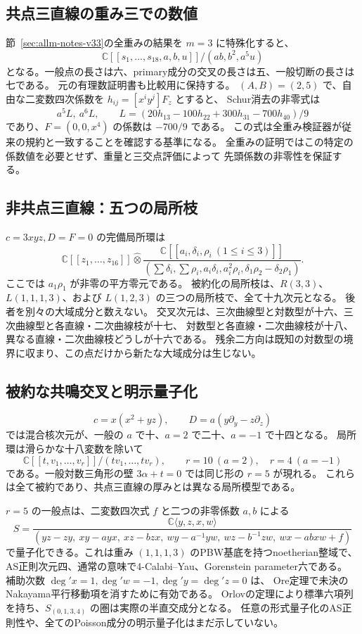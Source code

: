 \subsection{共点三直線の重み三での数値}
節~\ref{sec:allm-notes-v33}の全重みの結果を $m=3$ に特殊化すると、
\[
 \mathbb C[[s_1,\ldots,s_{18},a,b,u]]/(ab,b^2,a^5u)
\]
となる。一般点の長さは六、primary成分の交叉の長さは五、一般切断の長さは七である。
元の有理数証明書も比較用に保持する。
$(A,B)=(2,5)$ で、自由な二変数四次係数を $h_{ij}=[x^iy^j]F_z$ とすると、
Schur消去の非零式は
\[
 a^5L,\ a^6L,\qquad
 L=(20h_{13}-100h_{22}+300h_{31}-700h_{40})/9
\]
であり、$F=(0,0,x^4)$ の係数は $-700/9$ である。
この式は全重み検証器が従来の規約と一致することを確認する基準になる。
全重みの証明ではこの特定の係数値を必要とせず、重量と三交点評価によって
先頭係数の非零性を保証する。

\subsection{非共点三直線：五つの局所枝}
$c=3xyz,D=F=0$ の完備局所環は
\[
 \mathbb C[[z_1,\ldots,z_{16}]]\widehat\otimes
 \frac{\mathbb C[[a_i,\delta_i,\rho_i\ (1\le i\le3)]]}
 {(\sum\delta_i,\sum\rho_i,a_i\delta_i,a_i^2\rho_i,
     \delta_1\rho_2-\delta_2\rho_1)}.
\]
ここでは $a_1\rho_1$ が非零の平方零元である。
被約化の局所枝は、$R(3,3)$、$L(1,1,1,3)$、および
$L(1,2,3)$ の三つの局所枝で、全て十九次元となる。
後者を別々の大域成分と数えない。
交叉次元は、三次曲線型と対数型が十六、三次曲線型と各直線・二次曲線枝が十七、
対数型と各直線・二次曲線枝が十八、異なる直線・二次曲線枝どうしが十六である。
残余二方向は既知の対数型の境界に収まり、この点だけから新たな大域成分は生じない。

\subsection{被約な共鳴交叉と明示量子化}
\[
 c=x(x^2+yz),\qquad D=a(y\partial_y-z\partial_z)
\]
では混合核次元が、一般の $a$ で十、$a=2$ で二十、$a=-1$ で十四となる。
局所環は滑らかな十八変数を除いて
\[
 \mathbb C[[t,v_1,\ldots,v_r]]/(tv_1,\ldots,tv_r),
 \qquad r=10\ (a=2),\quad r=4\ (a=-1)
\]
である。一般対数三角形の壁 $3\alpha+t=0$ では同じ形の $r=5$ が現れる。
これらは全て被約であり、共点三直線の厚みとは異なる局所模型である。

$r=5$ の一般点は、二変数四次式 $f$ と二つの非零係数 $a,b$ による
\[
 S=\frac{\mathbb C\langle y,z,x,w\rangle}
 {(yz-zy,\ xy-ayx,\ xz-bzx,\ wy-a^{-1}yw,\ wz-b^{-1}zw,\ wx-abxw+f)}
\]
で量子化できる。これは重み $(1,1,1,3)$ のPBW基底を持つnoetherian整域で、
AS正則次元四、通常の意味で4-Calabi--Yau、Gorenstein parameter六である。
補助次数 $\deg' x=1,\deg' w=-1,\deg' y=\deg' z=0$ は、
Ore定理で未決のNakayama平行移動項を消すために有効である。
Orlovの定理により標準六項列を持ち、$S_{(0,1,3,4)}$ の圏は実際の半直交成分となる。
任意の形式量子化のAS正則性や、全てのPoisson成分の明示量子化はまだ示していない。

